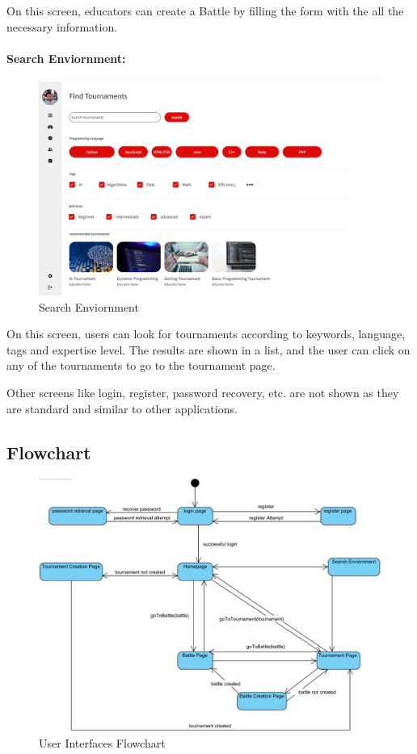 \documentclass{article}
\begin{document}
On this screen, educators can create a Battle by filling the form with the all the necessary information.

\paragraph{Search Enviornment:}

\begin{figure}[H]
    \centering
    \includegraphics[width=1\textwidth]{images/UI/Search.png}
    \caption{Search Enviornment}
    \label{fig:SearchEnviornment}
\end{figure}

On this screen, users can look for tournaments according to keywords, language, tags and expertise level.
The results are shown in a list, and the user can click on any of the tournaments to go to the tournament page.

Other screens like login, register, password recovery, etc. are not shown as they are standard and similar to other applications.

\subsection{Flowchart}

\begin{figure}[H]
    \centering
    \includegraphics[width=1\textwidth]{images/UI/UserInterfaceFlowchart.png}
    \caption{User Interfaces Flowchart}
    \label{fig:UserInterfacesFlowchart}
\end{figure}
\end{document}
